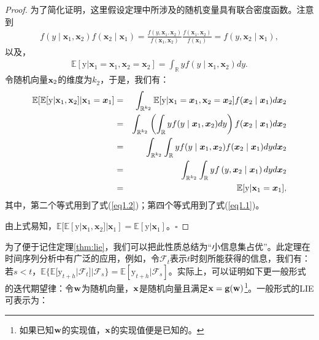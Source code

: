\documentclass[cn,11pt,chinese]{elegantbook}
\begin{document}
\begin{proof}
	为了简化证明，这里假设定理中所涉及的随机变量具有联合密度函数。注意到
	\begin{eqnarray}\label{eq1.1}
		f\left(y \mid \boldsymbol{x}_{1}, \boldsymbol{x}_{2}\right) f\left(\boldsymbol{x}_{2} \mid \boldsymbol{x}_{1}\right)=\frac{f\left(y, \boldsymbol{x}_{1}, \boldsymbol{x}_{2}\right)}{f\left(\boldsymbol{x}_{1}, \boldsymbol{x}_{2}\right)} \frac{f\left(\boldsymbol{x}_{1}, \boldsymbol{x}_{2}\right)}{f\left(\boldsymbol{x}_{1}\right)}=f\left(y, \boldsymbol{x}_{2} \mid \boldsymbol{x}_{1}\right),
	\end{eqnarray}
	以及，
	\begin{eqnarray}\label{eq1.2}
		\mathbb{E}[\mathrm{y}|\mathbf{x}_{1}=\boldsymbol{x}_{1},\mathbf{x}_{2}=\boldsymbol{x}_{2}]=\int_{\mathbb{R}}yf(y\mid \boldsymbol{x}_{1}, \boldsymbol{x}_{2})dy.
	\end{eqnarray}
	令随机向量$\bold{x}_{2}$的维度为$k_2$，于是，我们有：
	\begin{eqnarray*}
		\mathbb{E}[\mathbb{E}[\mathrm{y}|\bold{x}_{1},\bold{x}_{2}]|\bold{x}_{1}=\boldsymbol{x}_{1}]&=&\int_{\mathbb{R}^{k_{2}}}\mathbb{E}[\mathrm{y}|\mathbf{x}_{1}=\boldsymbol{x}_{1},\mathbf{x}_{2}=\boldsymbol{x}_{2}]f(\boldsymbol{x}_{2}\mid \boldsymbol{x}_{1})d\boldsymbol{x}_{2}\\
		&=&\int_{\mathbb{R}^{k_{2}}}\left(\int_{\mathbb{R}}yf(y\mid \boldsymbol{x}_{1}, \boldsymbol{x}_{2})dy\right)f(\boldsymbol{x}_{2}\mid \boldsymbol{x}_{1})d\boldsymbol{x}_{2}\\
		&=&\int_{\mathbb{R}^{k_{2}}}\int_{\mathbb{R}}yf(y\mid \boldsymbol{x}_{1}, \boldsymbol{x}_{2})f(\boldsymbol{x}_{2}\mid \boldsymbol{x}_{1})dyd\boldsymbol{x}_{2}\\
		&=&\int_{\mathbb{R}^{k_{2}}}\int_{\mathbb{R}}yf\left(y, \boldsymbol{x}_{2} \mid \boldsymbol{x}_{1}\right)dyd\boldsymbol{x}_{2}\\
		&=&\mathbb{E}[\mathrm{y}|\bold{x}_{1}=\boldsymbol{x}_{1}],
	\end{eqnarray*}
	其中，第二个等式用到了式(\ref{eq1.2})；第四个等式用到了式(\ref{eq1.1})。
	
	由上式易知，$\mathbb{E}[\mathbb{E}[\mathrm{y}|\mathbf{x}_{1},\mathbf{x}_{2}]|\mathbf{x}_{1}]=\mathbb{E}[\mathrm{y}|\mathbf{x}_{1}]$。\hfill$\square$
\end{proof}
为了便于记住定理\ref{thm:lie}，我们可以把此性质总结为“小信息集占优”。此定理在时间序列分析中有广泛的应用，例如，令$\mathscr{F}_{t}$表示$t$时刻所能获得的信息，我们有：若$s<t$，$\mathbb{E}\{\mathbb{E}[\mathrm{y}_{t+h}|\mathscr{F}_{t}]|\mathscr{F}_{s}\}=\mathbb{E}[\mathrm{y}_{t+h}|\mathscr{F}_{s}]$。实际上，可以证明如下更一般形式的迭代期望律：令$\bold{w}$为随机向量，$\bold{x}$是随机向量且满足$\bold{x}=\bold{g}(\bold{w})$\footnote{如果已知$\bold{w}$的实现值，$\bold{x}$的实现值便是已知的。}。一般形式的LIE可表示为：
\end{document}
